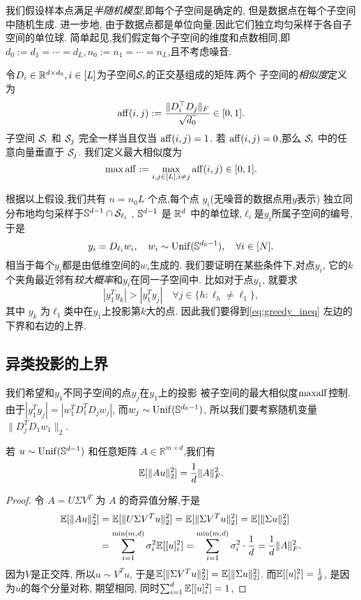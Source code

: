 我们假设样本点满足\emph{半随机模型},即每个子空间是确定的,
但是数据点在每个子空间中随机生成. 进一步地,
由于数据点都是单位向量,因此它们独立均匀采样于各自子空间的单位球.
简单起见,我们假定每个子空间的维度和点数相同,即\(d_0:= d_1=\cdots=d_L,
n_0:= n_1=\cdots=n_L\),且不考虑噪音.

令\(D_i\in \R^{d\times d_0}, i\in [L]\)为子空间\(\cS_i\)的正交基组成的矩阵.两个
子空间的\emph{相似度}定义为
\begin{align*}
  \aff(i,j) := \frac{\|D_i^\top D_j\|_F}{\sqrt{d_0}} \in [0, 1].
\end{align*}
子空间 \(\cS_i\) 和 \(\cS_j\) 完全一样当且仅当 \(\aff(i,j) = 1\).
若 \(\aff(i,j) = 0\),那么 \(\cS_i\) 中的任意向量垂直于 \(\cS_j\).
我们定义最大相似度为
\[ \max \aff := \max_{i,j \in [L], i \neq j} \aff(i,j) \in [0,1].\]

根据以上假设,我们共有 \(n = n_0 L\) 个点,每个点 \(y_i\)(无噪音的数据点用\(y\)表示)
独立同分布地均匀采样于\(\S^{d-1} \cap \cS_{\ell_i}\) ,
\(\S^{d-1}\) 是 \(\R^d\) 中的单位球,\(\ell_i\)是\(y_i\)所属子空间的编号,于是
\[
  y_i = D_{\ell_i} w_i ,\quad w_i \sim \Unif(\S^{d_0-1}) ,\quad
  \forall i \in [N].
\]
相当于每个\(y_i\)都是由低维空间的\(w_i\)生成的.
我们要证明在某些条件下,对点\(y_i\),
它的\(k\)个夹角最近邻有\emph{较大概率}和\(y_i\)在同一子空间中.
比如对于点\(y_1\), 就要求
\begin{equation}
  |y_1^T y_k|>|y_1^T y_j| \quad \forall j \in \{h:\ell_h \ne \ell_1\},
  \label{eq:greedy_ineq}
\end{equation}
其中 \(y_k\) 为\(\ell_1\)类中在\(y_1\)上投影第\(k\)大的点.
因此我们要得到\eqref{eq:greedy_ineq} 左边的下界和右边的上界.

\subsection{异类投影的上界}
我们希望和\(y_1\)不同子空间的点\(y_j\)在\(y_1\)上的投影
被子空间的最大相似度\(\maff\)控制.
由于\(|y_1^T y_j| = |w_1^T D_1^T D_j w_j|\), 而\(w_j \sim \Unif(\S^{d_0-1})\),
所以我们要考察随机变量\(\|D_j^T D_1 w_1\|_2\).

\begin{lemma} \label{lem:expectation}
  若 \(u \sim \Unif(\mathbb{S}^{d-1})\) 和任意矩阵 
  \(A \in \mathbb{R}^{m \times d}\),我们有
  \[ \E[\|Au\|_2^2] = \frac{1}{d} \|A\|_F^2. \]
\end{lemma}
\begin{proof}
令 \(A = U \Sigma V^T\) 为 \(A\) 的奇异值分解,于是
\begin{align*}
  \E[\|Au\|_2^2] &= \E[\|U \Sigma V^T u\|_2^2]= \E[\|\Sigma V^Tu\|_2^2] 
  = \E[\|\Sigma u\|_2^2]\\
  &= \sum_{i=1}^{\min(m,d)} \sigma_i^2 \E[ [u]_i^2] 
  = \sum_{i=1}^{\min(m,d)} \sigma_i^2 \cdot \frac{1}{d} = \frac{1}{d} \|A\|_F^2.
\end{align*}
因为\(V\)是正交阵, 所以\(u\sim V^T u\), 于是\(\E[\|\Sigma V^Tu\|_2^2]
=\E[\|\Sigma u\|_2^2]\). 而\(\E[[u]_i^2] = \frac{1}{d}\), 
是因为\(u\)的每个分量对称, 期望相同, 同时\(\sum_{i=1}^d \E[ [u]_i^2] = 1 \),
\end{proof}

